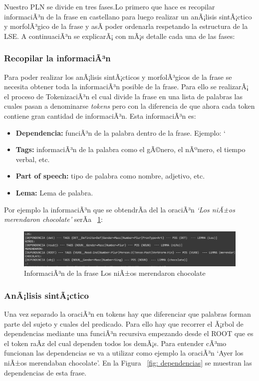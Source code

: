 Nuestro PLN se divide en tres fases.Lo primero que hace es recopilar informaciÃ³n de la frase en castellano para luego realizar un anÃ¡lisis sintÃ¡ctico y morfolÃ³gico de la frase y asÃ­ poder ordenarla respetando la estructura de la LSE. A continuaciÃ³n se explicarÃ¡ con mÃ¡s detalle cada una de las fases:

\subsubsection{Recopilar la  informaciÃ³n} 
Para poder realizar los anÃ¡lisis sintÃ¡cticos y morfolÃ³gicos de la frase se necesita obtener toda la informaciÃ³n posible de la frase. Para ello se realizarÃ¡ el proceso de TokenizaciÃ³n el cual divide la frase en una lista de palabras las cuales pasan a denominarse \textit{tokens} pero con la diferencia de que ahora cada token contiene gran cantidad de informaciÃ³n. Esta informaciÃ³n es:


\begin{itemize}
	
	\item \textbf{Dependencia:} funciÃ³n de la palabra dentro de la frase. Ejemplo: `
	\item \textbf{Tags:} informaciÃ³n de la palabra como el gÃ©nero, el nÃºmero, el tiempo verbal, etc.
	\item \textbf{Part of speech:} tipo de palabra como nombre, adjetivo, etc.
	\item \textbf{Lema:} Lema de palabra.	
	
\end{itemize}


Por ejemplo la informaciÃ³n que se obtendrÃ­a del la oraciÃ³n \textit{`Los niÃ±os merendaron chocolate'} serÃ­a ~\ref {fig: tokenInformacion}:
\begin{figure}[h]
	\centering
	\includegraphics[width=1 \textwidth]{Imagenes/Fuentes/PNL/InfoPLN.png}
	\caption{ InformaciÃ³n de la frase Los niÃ±os merendaron chocolate}
	\label {fig: tokenInformacion}
\end{figure}



\subsubsection{AnÃ¡lisis sintÃ¡ctico} 
Una vez separado la oraciÃ³n en tokens hay que diferenciar que palabras forman parte del sujeto y cuales del predicado. Para ello hay que recorrer el Ã¡rbol de dependencias mediante una funciÃ³n recursiva empezando desde el ROOT que es el token raÃ­z del cual dependen todos los demÃ¡s. Para entender cÃ³mo funcionan las dependencias se va a utilizar como ejemplo la oraciÃ³n `Ayer los niÃ±os merendaban chocolate'. En la Figura ~\ref {fig: dependencias} se muestran las dependencias de esta frase.

